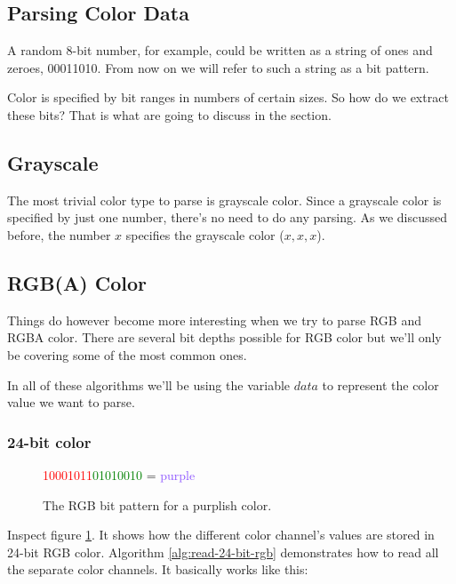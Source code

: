 \begin{refsection}
  \section{Parsing Color Data}
  \label{sec:parsing-color-data}

  A random 8-bit number, for example, could be written as a string of
  ones and zeroes, 00011010. From now on we will refer to such a
  string as a bit pattern.

  Color is specified by bit ranges in numbers of certain
  sizes. So how do we extract these bits? That is what are going to
  discuss in the section.

  \subsection{Grayscale}

  The most trivial color type to parse is grayscale color. Since a
  grayscale color is specified by just one number, there's no need to
  do any parsing. As we discussed before, the number $x$ specifies the
  grayscale color \mbox{($x,x,x$)}. 

  \subsection{RGB(A) Color}

  Things do however become more interesting when we try to parse RGB
  and RGBA color. There are several bit depths possible for RGB
  color but we'll only be covering some of the most common ones.

  In all of these algorithms we'll be using the variable $data$ to
  represent the color value we want to parse.

  \subsubsection{24-bit color}

  \begin{figure}
    \centering
    {\huge\textcolor{red}{10001011}\textcolor{green}{01010010}\textcolor{blue}{\fullbyte}
    = \textcolor[HTML]{8B52FF}{purple}}
    \caption{The RGB bit pattern for a purplish color.}
    \label{fig:24-bit-colors-bits}
  \end{figure}

  Inspect figure \ref{fig:24-bit-colors-bits}. It shows how the
  different color channel's values are stored in 24-bit RGB
  color. Algorithm \ref{alg:read-24-bit-rgb} demonstrates how to read
  all the separate color channels. It basically works like this:


\end{refsection}
